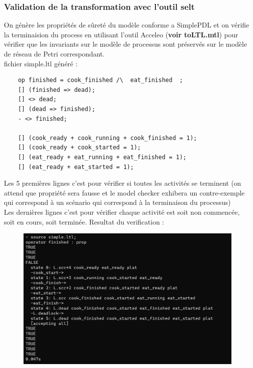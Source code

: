 \documentclass{article}
\begin{document}
\subsubsection{Validation de la transformation avec l'outil selt}
On génère les propriétés de sûreté du modèle conforme a SimplePDL et on vérifie la terminaision 
du process en utilisant l'outil Acceleo (\textbf{voir toLTL.mtl})
pour vérifier que les invariants sur le modèle de processus sont préservés sur le modèle de réseau de Petri correspondant. \\
fichier simple.ltl généré :
\begin{verbatim}
    op finished = cook_finished /\  eat_finished  ; 
    [] (finished => dead);
    [] <> dead;
    [] (dead => finished);
    - <> finished;
    
    [] (cook_ready + cook_running + cook_finished = 1);
    [] (cook_ready + cook_started = 1);
    [] (eat_ready + eat_running + eat_finished = 1);
    [] (eat_ready + eat_started = 1);
\end{verbatim}
Les 5 premières lignes c'est pour vérifier si toutes les activités se terminent (on attend que propriété sera fausse et le model 
checker exhibera un contre-exemple qui correspond à un scénario qui correspond à la terminaison du processus) \\
Les dernières lignes c'est pour vérifier chaque activité est soit non commencée, soit en cours, soit terminée.
Resultat du verification :
\begin{figure}[H]
    \centering
    \includegraphics[width = 15cm]{selt-simple.png}
\end{figure}
\end{document}
